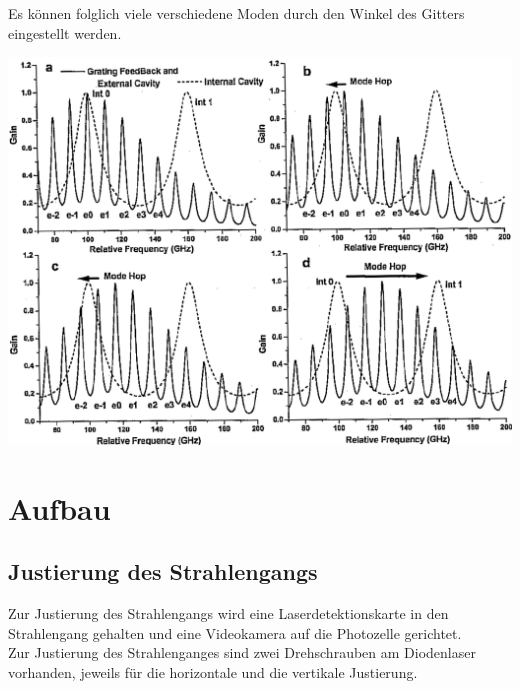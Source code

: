 \documentclass[captions=tableheading]{scrartcl}
\begin{document}
Es können folglich viele verschiedene Moden durch den Winkel des Gitters eingestellt werden. 
\begin{center}
	\includegraphics[width=15cm]{images/gainmulti.png}
	\label{fig:gainmulti}
\end{center}
 
\newpage
\section{Aufbau}

\subsection{Justierung des Strahlengangs}
Zur Justierung des Strahlengangs wird eine Laserdetektionskarte in den Strahlengang gehalten und eine Videokamera auf die Photozelle gerichtet. \\
Zur Justierung des Strahlenganges sind zwei Drehschrauben am Diodenlaser vorhanden, jeweils für die horizontale und die vertikale Justierung.
 
\end{document}

